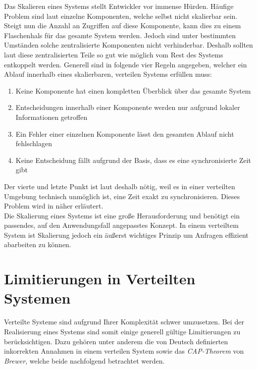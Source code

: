 Das Skalieren eines Systems stellt Entwickler vor immense Hürden. Häufige Problem sind laut \cite{tanenbaum2007distributed} einzelne Komponenten, welche selbst nicht skalierbar sein. Steigt nun die Anzahl an Zugriffen auf diese Komponente, kann dies zu einem Flaschenhals für das gesamte System werden. Jedoch sind unter bestimmten Umständen solche zentralisierte Komponenten nicht verhinderbar. Deshalb sollten laut \cite{tanenbaum2007distributed} diese zentralisierten Teile so gut wie möglich vom Rest des Systems entkoppelt werden. Generell sind in \cite{tanenbaum2007distributed} folgende vier Regeln angegeben, welcher ein Ablauf innerhalb eines skalierbaren, verteilen Systems erfüllen muss:
\begin{enumerate}
  \item Keine Komponente hat einen kompletten Überblick über das gesamte System
  \item Entscheidungen innerhalb einer Komponente werden nur aufgrund lokaler Informationen getroffen
  \item Ein Fehler einer einzelnen Komponente lässt den gesamten Ablauf nicht fehlschlagen
  \item Keine Entscheidung fällt aufgrund der Basis, dass es eine synchronisierte Zeit gibt
\end{enumerate}
Der vierte und letzte Punkt ist laut \cite{tanenbaum2007distributed} deshalb nötig, weil es in einer verteilten Umgebung technisch unmöglich ist, eine Zeit exakt zu synchronisieren. Dieses Problem wird in \cite{lamport1978time} näher erläutert.\\
Die Skalierung eines Systems ist eine große Herausforderung und benötigt ein passendes, auf den Anwendungsfall angepasstes Konzept. In einem verteiltem System ist Skalierung jedoch ein äußerst wichtiges Prinzip um Anfragen effizient abarbeiten zu können.\cite{designingDistributedSystems}
 
\section{Limitierungen in Verteilten Systemen}
Verteilte Systeme sind aufgrund Ihrer Komplexität schwer umzusetzen. Bei der Realisierung eines Systems sind somit einige generell gültige Limitierungen zu berücksichtigen. Dazu gehören unter anderem die von Deutsch definierten inkorrekten Annahmen in einem verteilen System sowie das \textit{CAP-Theorem} von \textit{Brewer}, welche beide nachfolgend betrachtet werden.

